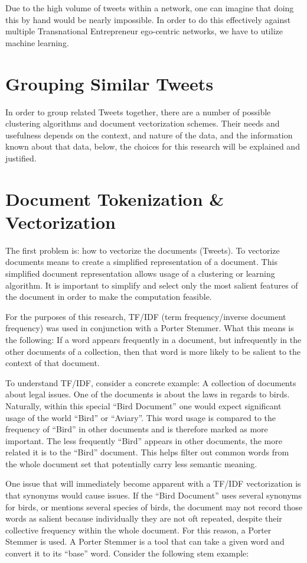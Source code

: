 Due to the high volume of tweets within a network, one can imagine
that doing this by hand would be nearly impossible. In order to do
this effectively against multiple Transnational Entrepreneur
ego-centric networks, we have to utilize machine learning.

\section{Grouping Similar Tweets}
In order to group related Tweets together, there are a number of
possible clustering algorithms and document vectorization
schemes. Their needs and usefulness depends on the context, and nature
of the data, and the information known about that data, below, the
choices for this research will be explained and justified.

\section{Document Tokenization \& Vectorization}
The first problem is: how to vectorize the documents (Tweets). To
vectorize documents means to create a simplified representation of a
document. This simplified document representation allows usage of a
clustering or learning algorithm. It is important to simplify and
select only the most salient features of the document in order to make
the computation feasible.

For the purposes of this research, TF/IDF (term frequency/inverse
document frequency) was used in conjunction with a Porter
Stemmer. What this means is the following: If a word appears
frequently in a document, but infrequently in the other documents of a
collection, then that word is more likely to be salient to the context
of that document.

To understand TF/IDF, consider a concrete example: A collection of
documents about legal issues. One of the documents is about the laws
in regards to birds. Naturally, within this special ``Bird Document''
one would expect significant usage of the world ``Bird'' or
``Aviary''. This word usage is compared to the frequency of ``Bird''
in other documents and is therefore marked as more important. The less
frequently ``Bird'' appears in other documents, the more related it is
to the ``Bird'' document. This helps filter out common words from the
whole document set that potentially carry less semantic meaning.

One issue that will immediately become apparent with a TF/IDF
vectorization is that synonyms would cause issues. If the ``Bird
Document'' uses several synonyms for birds, or mentions several
species of birds, the document may not record those words as salient
because individually they are not oft repeated, despite their
collective frequency within the whole document. For this reason,
a Porter Stemmer is used. A Porter Stemmer is a tool that can take
a given word and convert it to its ``base'' word. Consider the following
stem example:

